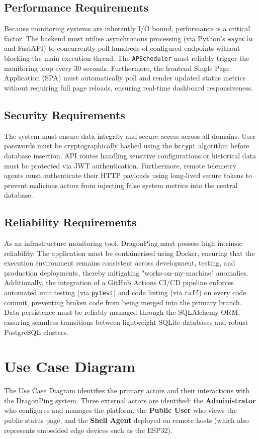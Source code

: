 \documentclass[12pt,a4paper,oneside]{report}
\begin{document}
\subsection{Performance Requirements}
\noindent Because monitoring systems are inherently I/O bound, performance is a critical factor. The backend must utilise asynchronous processing (via Python's \texttt{asyncio} and FastAPI) to concurrently poll hundreds of configured endpoints without blocking the main execution thread. The \texttt{APScheduler} must reliably trigger the monitoring loop every 30 seconds. Furthermore, the frontend Single Page Application (SPA) must automatically poll and render updated status metrics without requiring full page reloads, ensuring real-time dashboard responsiveness.

\subsection{Security Requirements}
\noindent The system must ensure data integrity and secure access across all domains. User passwords must be cryptographically hashed using the \texttt{bcrypt} algorithm before database insertion. API routes handling sensitive configurations or historical data must be protected via JWT authentication. Furthermore, remote telemetry agents must authenticate their HTTP payloads using long-lived secure tokens to prevent malicious actors from injecting false system metrics into the central database. 

\subsection{Reliability Requirements}
\noindent As an infrastructure monitoring tool, DragonPing must possess high intrinsic reliability. The application must be containerised using Docker, ensuring that the execution environment remains consistent across development, testing, and production deployments, thereby mitigating "works-on-my-machine" anomalies. Additionally, the integration of a GitHub Actions CI/CD pipeline enforces automated unit testing (via \texttt{pytest}) and code linting (via \texttt{ruff}) on every code commit, preventing broken code from being merged into the primary branch. Data persistence must be reliably managed through the SQLAlchemy ORM, ensuring seamless transitions between lightweight SQLite databases and robust PostgreSQL clusters.

\section{Use Case Diagram}
\noindent The Use Case Diagram identifies the primary actors and their interactions with the DragonPing system. Three external actors are identified: the \textbf{Administrator} who configures and manages the platform, the \textbf{Public User} who views the public status page, and the \textbf{Shell Agent} deployed on remote hosts (which also represents embedded edge devices such as the ESP32).
\end{document}
